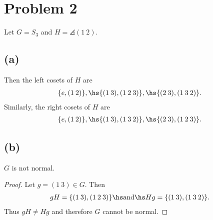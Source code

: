 \documentclass{article}
\begin{document}
\section*{Problem 2}

Let $G=S_3$ and $H=\angles{(1\: 2)}$.

\subsection*{(a)}

Then the left cosets of $H$ are
\begin{align*}
	\{e, (1\:2)\},\hs \{(1\:3), (1\:2\:3)\},\hs \{(2\:3), (1\:3\:2)\}.
\end{align*}
Similarly, the right cosets of $H$ are
\begin{align*}
	\{e, (1\:2)\},\hs \{(1\:3), (1\:3\:2)\},\hs \{(2\:3),(1\:2\:3)\}.
\end{align*}

\subsection*{(b)}

\begin{claim*}
	$G$ is not normal.
\end{claim*}

\begin{proof}
	Let $g=(1\:3)\in G$. Then
	\begin{align*}
		gH=\{(1\:3), (1\:2\:3)\}\hs\text{and}\hs Hg=\{(1\:3), (1\:3\:2)\}.
	\end{align*}
	Thus $gH\not=Hg$ and therefore $G$ cannot be normal.
\end{proof}
\end{document}
